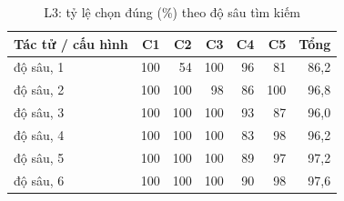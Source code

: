 \begin{table}[H]
  \centering
  \small
  \caption{L3: tỷ lệ chọn đúng (\%) theo độ sâu tìm kiếm}
  \label{tab:cs-ct-l3}
  \begin{tabular}{lrrrrrr}
    \toprule
    Tác tử / cấu hình & C1 & C2 & C3 & C4 & C5 & Tổng \\
    \midrule
    độ sâu, 1 & 100 & 54 & 100 & 96 & 81 & 86,2 \\
    độ sâu, 2 & 100 & 100 & 98 & 86 & 100 & 96,8 \\
    độ sâu, 3 & 100 & 100 & 100 & 93 & 87 & 96,0 \\
    độ sâu, 4 & 100 & 100 & 100 & 83 & 98 & 96,2 \\
    độ sâu, 5 & 100 & 100 & 100 & 89 & 97 & 97,2 \\
    độ sâu, 6 & 100 & 100 & 100 & 90 & 98 & 97,6 \\
    \bottomrule
  \end{tabular}
\end{table}

